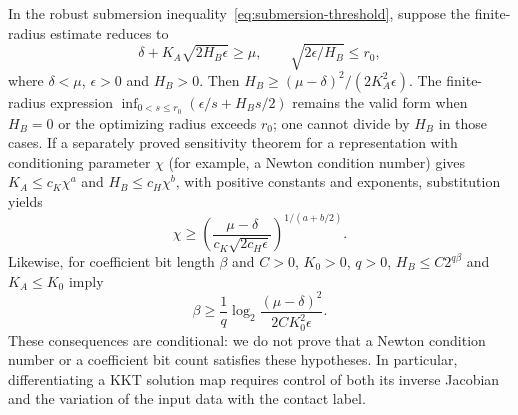 In the robust submersion inequality~\eqref{eq:submersion-threshold}, suppose the finite-radius estimate
reduces to
\[
 \delta+K_A\sqrt{2H_B\epsilon}\geq\mu,
 \qquad \sqrt{2\epsilon/H_B}\leq r_0,
\]
where $\delta<\mu$, $\epsilon>0$ and $H_B>0$.
Then
$H_B\geq(\mu-\delta)^2/(2K_A^2\epsilon)$.
The finite-radius expression $\inf_{0<s\leq r_0}
(\epsilon/s+H_Bs/2)$ remains the valid form when $H_B=0$ or the
optimizing radius exceeds $r_0$; one cannot divide by $H_B$ in those cases.
If a separately proved sensitivity theorem for a representation with
conditioning parameter $\chi$ (for example, a Newton condition number)
gives $K_A\leq c_K\chi^a$ and $H_B\leq c_H\chi^b$, with positive
constants and exponents, substitution yields
\[
 \chi\geq
 \left(\frac{\mu-\delta}{c_K\sqrt{2c_H\epsilon}}\right)^{1/(a+b/2)}.
\]
Likewise, for coefficient bit length $\beta$ and $C>0$, $K_0>0$, $q>0$,
$H_B\leq C2^{q\beta}$ and $K_A\leq K_0$ imply
\[
 \beta\geq\frac1q\log_2
 \frac{(\mu-\delta)^2}{2CK_0^2\epsilon}.
\]
These consequences are conditional: we do not prove that a Newton
condition number or a coefficient bit count satisfies these hypotheses.  In particular, differentiating a KKT solution
map requires control of both its inverse Jacobian and the variation of
the input data with the contact label.
